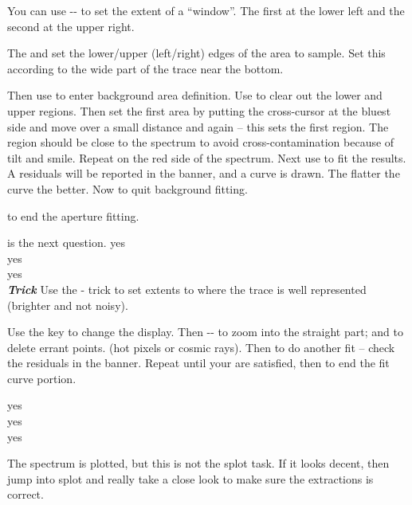 You can use -- to set the extent of a ``window''.
The first  at the lower left and the second  at the upper right.

The  and  set the lower/upper (left/right) edges of
the area to sample.  Set this according to the wide part of the trace
near the bottom.

Then use  to enter background area definition. Use  
to clear out the lower and upper regions. Then set the first area by putting
the cross-cursor at the bluest side and  move over a small distance
and  again -- this sets the first region. The region should be close
to the spectrum to avoid cross-contamination because of tilt and smile. Repeat
on the red side of the spectrum. Next use  to fit the results. A residuals
will be reported in the banner, and a curve is drawn. The flatter the curve the better.
Now  to quit background fitting.

 to end the aperture fitting.

 is the next question. yes \\
 yes \\
 yes \\

\textbf{\emph{Trick}} Use the  -  trick to set extents 
to where the trace is well represented (brighter and not noisy).

Use the  key to change the display. Then --
to zoom into the straight part; and  to delete errant points. (hot
pixels or cosmic rays). Then  to do another fit -- check the residuals
in the banner. Repeat until your are satisfied, then  to end the fit
curve portion.

  yes\\
 yes\\
 yes

The spectrum is plotted, but this is not the splot task. If it
looks decent, then jump into splot and really take a close look
to make sure the extractions is correct.
